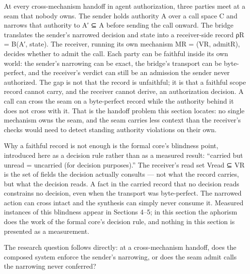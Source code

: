 \documentclass[
  10pt,
]{article}
\renewcommand{\_}{\origunderscore\allowbreak}
\begin{document}
At every cross-mechanism handoff in agent authorization, three parties
meet at a seam that nobody owns. The sender holds authority A over a
call space C and narrows that authority to A′ ⊆ A before sending the
call onward. The bridge translates the sender's narrowed decision and
state into a receiver-side record \mbox{ρ\_R} = B(A′, state). The receiver,
running its own mechanism M\_R = (V\_R, admit\_R), decides whether to
admit the call. Each party can be faithful inside its own world: the
sender's narrowing can be exact, the bridge's transport can be
byte-perfect, and the receiver's verdict can still be an admission the
sender never authorized. The gap is not that the record is unfaithful;
it is that a faithful scope record cannot carry, and the receiver cannot
derive, an authorization decision. A call can cross the seam on a
byte-perfect record while the authority behind it does not cross with
it. That is the handoff problem this section locates: no single
mechanism owns the seam, and the seam carries less context than the
receiver's checks would need to detect standing authority violations on
their own.

Why a faithful record is not enough is the formal core's blindness
point, introduced here as a decision rule rather than as a measured
result: ``carried but unread = uncarried (for decision purposes).'' The
receiver's read set V\_read ⊆ V\_R is the set of fields the decision
actually consults --- not what the record carries, but what the decision
reads. A fact in the carried record that no decision reads constrains no
decision, even when the transport was byte-perfect. The narrowed action
can cross intact and the synthesis can simply never consume it. Measured
instances of this blindness appear in Sections 4--5; in this section the
aphorism does the work of the formal core's decision rule, and nothing
in this section is presented as a measurement.

The research question follows directly: at a cross-mechanism handoff,
does the composed system enforce the sender's narrowing, or does the
seam admit calls the narrowing never conferred?
\end{document}
